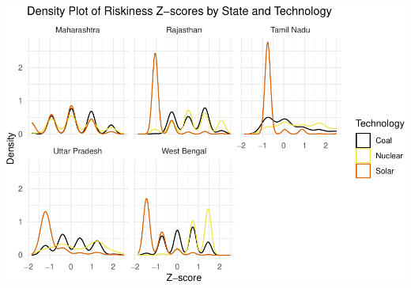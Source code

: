 \documentclass[
]{article}
\begin{document}
\includegraphics{nuclear-in-comparison_files/figure-latex/unnamed-chunk-35-4.pdf}
\end{document}
